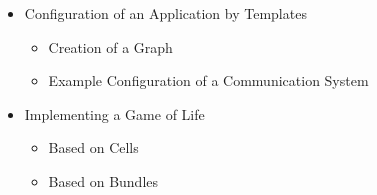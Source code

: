 \begin{itemize}
\item Configuration of an Application by Templates
  \begin{itemize}
  \item Creation of a Graph
  \item Example Configuration of a Communication System
  \end{itemize}

\item Implementing a Game of Life
  \begin{itemize}
  \item Based on Cells
  \item Based on Bundles
  \end{itemize}

\end{itemize}




\cleardoublepage

